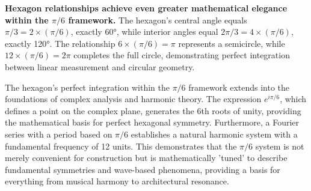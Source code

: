 \documentclass[11pt]{article}
\begin{document}
\textbf{Hexagon relationships achieve even greater mathematical elegance within the $\pi/6$ framework.} The hexagon's central angle equals $\pi/3 = 2 \times (\pi/6)$, exactly 60°, while interior angles equal $2\pi/3 = 4 \times (\pi/6)$, exactly 120°. The relationship $6 \times (\pi/6) = \pi$ represents a semicircle, while $12 \times (\pi/6) = 2\pi$ completes the full circle, demonstrating perfect integration between linear measurement and circular geometry.

The hexagon's perfect integration within the $\pi/6$ framework extends into the foundations of complex analysis and harmonic theory. The expression $e^{i\pi/6}$, which defines a point on the complex plane, generates the 6th roots of unity, providing the mathematical basis for perfect hexagonal symmetry. Furthermore, a Fourier series with a period based on $\pi/6$ establishes a natural harmonic system with a fundamental frequency of 12 units. This demonstrates that the $\pi/6$ system is not merely convenient for construction but is mathematically 'tuned' to describe fundamental symmetries and wave-based phenomena, providing a basis for everything from musical harmony to architectural resonance.
\end{document}
